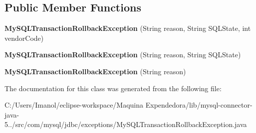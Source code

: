 \subsection*{Public Member Functions}
\begin{DoxyCompactItemize}
\item 
\mbox{\label{classcom_1_1mysql_1_1jdbc_1_1exceptions_1_1_my_s_q_l_transaction_rollback_exception_a0f38c8bf1f1cc4a8549a2ee70f54e3f2}} 
{\bfseries My\+S\+Q\+L\+Transaction\+Rollback\+Exception} (String reason, String S\+Q\+L\+State, int vendor\+Code)
\item 
\mbox{\label{classcom_1_1mysql_1_1jdbc_1_1exceptions_1_1_my_s_q_l_transaction_rollback_exception_a9607551eda0a2c81c11bed9c3338d2a7}} 
{\bfseries My\+S\+Q\+L\+Transaction\+Rollback\+Exception} (String reason, String S\+Q\+L\+State)
\item 
\mbox{\label{classcom_1_1mysql_1_1jdbc_1_1exceptions_1_1_my_s_q_l_transaction_rollback_exception_adf0d55cfb809899c416ad1c98618e62b}} 
{\bfseries My\+S\+Q\+L\+Transaction\+Rollback\+Exception} (String reason)
\end{DoxyCompactItemize}


The documentation for this class was generated from the following file\+:\begin{DoxyCompactItemize}
\item 
C\+:/\+Users/\+Imanol/eclipse-\/workspace/\+Maquina Expendedora/lib/mysql-\/connector-\/java-\/5../src/com/mysql/jdbc/exceptions/My\+S\+Q\+L\+Transaction\+Rollback\+Exception.\+java\end{DoxyCompactItemize}

